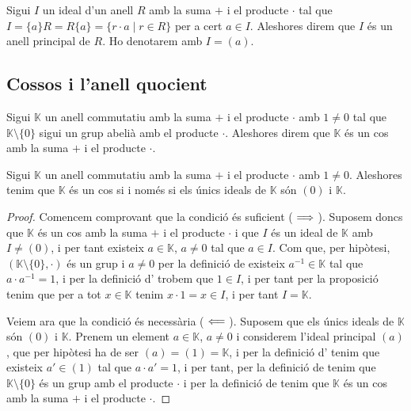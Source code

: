 \documentclass[../Apunts.tex]{subfiles}
\begin{document}
	\begin{definition}
		\label{def:ideal principal}
		Sigui \(I\) un ideal d'un anell \(R\) amb la suma \(+\) i el producte \(\cdot\) tal que \(I=\{a\}R=R\{a\}=\{r\cdot a\mid r\in R\}\) per a cert \(a\in I\). Aleshores direm que \(I\) és un anell principal de \(R\). Ho denotarem amb \(I=(a)\).
	\end{definition}
	\subsection{Cossos i l'anell quocient}
	\begin{definition}[Cos]
		\label{def:cos per anells}
		Sigui \(\mathbb{K}\) un anell commutatiu amb la suma \(+\) i el producte \(\cdot\) amb \(1\neq0\) tal que \(\mathbb{K}\setminus\{0\}\) sigui un grup abelià amb el producte \(\cdot\). Aleshores direm que \(\mathbb{K}\) és un cos amb la suma \(+\) i el producte \(\cdot\).
	\end{definition}
	\begin{proposition}
		\label{prop:condició equivalent a cos per anells}
		Sigui \(\mathbb{K}\) un anell commutatiu amb la suma \(+\) i el producte \(\cdot\) amb \(1\neq0\). Aleshores tenim que \(\mathbb{K}\) és un cos si i només si els únics ideals de \(\mathbb{K}\) són \((0)\) i \(\mathbb{K}\).
		\begin{proof}
			Comencem comprovant que la condició és suficient (\(\implies\)). Suposem doncs que \(\mathbb{K}\) és un cos amb la suma \(+\) i el producte \(\cdot\) i que \(I\) és un ideal de \(\mathbb{K}\) amb \(I\neq(0)\), i per tant existeix \(a\in\mathbb{K}\), \(a\neq0\) tal que \(a\in I\). Com que, per hipòtesi, \((\mathbb{K}\setminus\{0\},\cdot)\) és un grup i \(a\ne0\) per la definició de  existeix \(a^{-1}\in\mathbb{K}\) tal que \(a\cdot a^{-1}=1\), i per la definició d' trobem que \(1\in I\), i per tant per la proposició  tenim que per a tot \(x\in\mathbb{K}\) tenim \(x\cdot1=x\in I\), i per tant \(I=\mathbb{K}\).
			
			Veiem ara que la condició és necessària (\(\impliedby\)). Suposem que els únics ideals de \(\mathbb{K}\) són \((0)\) i \(\mathbb{K}\). Prenem un element \(a\in\mathbb{K}\), \(a\neq0\) i considerem l'ideal principal \((a)\), que per hipòtesi ha de ser \((a)=(1)=\mathbb{K}\), i per la definició d' tenim que existeix \(a'\in(1)\) tal que \(a\cdot a'=1\), i per tant, per la definició de  tenim que \(\mathbb{K}\setminus\{0\}\) és un grup amb el producte \(\cdot\) i per la definició de  tenim que \(\mathbb{K}\) és un cos amb la suma \(+\) i el producte \(\cdot\).
		\end{proof}
	\end{proposition}
\end{document}
